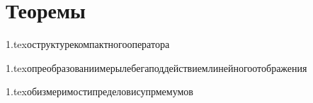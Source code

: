 





















\section{Теоремы}

{1.tex}{оструктурекомпактногооператора}

{1.tex}{опреобразованиимерылебегаподдействиемлинейногоотображения}

{1.tex}{обизмеримостипределовисупрмемумов}

